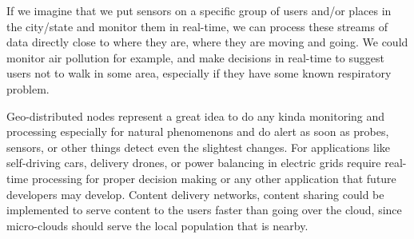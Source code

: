 If we imagine that we put sensors on a specific group of users and/or places in the city/state and monitor them in real-time, we can process these streams of data directly close to where they are, where they are moving and going. We could monitor air pollution for example, and make decisions in real-time to suggest users not to walk in some area, especially if they have some known respiratory problem.

Geo-distributed nodes represent a great idea to do any kinda monitoring and processing especially for natural phenomenons and do alert as soon as probes, sensors, or other things detect even the slightest changes. For applications like self-driving cars, delivery drones, or power balancing in electric grids require real-time processing for proper decision making or any other application that future developers may develop. Content delivery networks, content sharing could be implemented to serve content to the users faster than going over the cloud, since micro-clouds should serve the local population that is nearby.
%
%